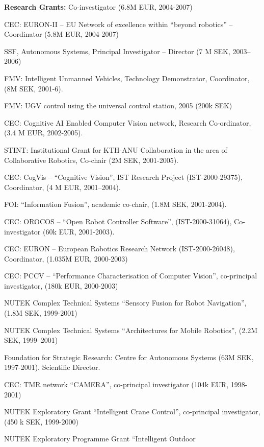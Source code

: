 \documentclass{article}
\begin{document}
\begin{cv}
\begin{cvlist}{\bf Research Grants:}
		Co-investigator (6.8M EUR, 2004-2007) %
		\item CEC: EURON-II -- EU Network of excellence within ``beyond
		robotics''  -- Coordinator (5.8M EUR, 2004-2007) %
		\item SSF, Autonomous Systems, Principal Investigator -- Director  (7
		M SEK, 2003--2006) %
		\item FMV: Intelligent Unmanned Vehicles, Technology Demonstrator,
		Coordinator, (8M SEK, 2001-6). %
		\item FMV: UGV control using the universal control station, 2005 (200k
		SEK) %
		\item CEC: Cognitive AI Enabled Computer Vision network, Research
		Co-ordinator, (3.4 M EUR, 2002-2005). %
		\item STINT: Institutional Grant for KTH-ANU Collaboration in the area
		of Collaborative Robotics, Co-chair (2M SEK, 2001-2005).%
		\item CEC: CogVis -- ``Cognitive Vision'', IST Research Project
		(IST-2000-29375), Coordinator, (4 M EUR, 2001--2004).%
		\item FOI: ``Information Fusion'', academic co-chair,  (1.8M SEK, 2001-2004).%
		\item CEC: OROCOS -- ``Open Robot Controller Software'',
		(IST-2000-31064), Co-investigator (60k EUR, 2001-2003).%
		\item CEC: EURON -- European Robotics Research Network
		(IST-2000-26048), Coordinator, (1.035M EUR, 2000-2003)%
		\item CEC: PCCV -- ``Performance Characterisation of Computer
		Vision'',  co-principal investigator, (180k EUR, 2000-2003)%
		\item NUTEK Complex Technical Systems ``Sensory Fusion for Robot
		Navigation'', (1.8M SEK, 1999-2001)%
		\item NUTEK Complex Technical Systems ``Architectures for Mobile
		Robotics'', (2.2M SEK, 1999--2001)%
		\item Foundation for Strategic Research: Centre for Autonomous Systems
		(63M SEK, 1997-2001). Scientific Director.%
		\item CEC: TMR network ``CAMERA'', co-principal investigator  (104k
		EUR, 1998-2001)%
		\item NUTEK Exploratory Grant ``Intelligent Crane Control'',
		co-principal investigator, (450 k SEK, 1999-2000)%
		\item NUTEK Exploratory Programme Grant ``Intelligent Outdoor

\end{cvlist}
\end{cv}
\end{document}
